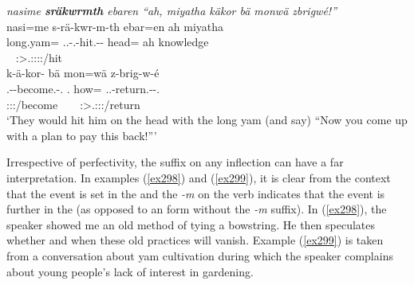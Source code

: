 \begin{exe}
	\ex \emph{nasime \textbf{sräkwrmth} ebaren ``ah, miyatha käkor bä monwä zbrigwé!''}\\
	\glll nasi=me s-rä-kwr-m-th ebar=en ah miyatha \\
	long.yam={\Ins} \Tsg.\Masc.\Bet-\Irr.\Ndu-hit.\Rs-\Dur-\Stnsg{} head={\Loc} ah knowledge\\
	~ {\footnotesize \Stpl:\Sbj>\Tsg.\Masc:\Obj:\Irr:\Pfv:\Bg/hit} ~ ~ ~\\
	\sn
	\glll k-ä-kor-\Zero{} bä mon=wä z-brig-w-é\\
	\M.\Bet-\Ndu-become.\Rs-\Ssg.{\Imp} \Second.{\Abs} how={\Emph} \Tsg.\F.\Bet-return.\Ext-\Ndu-\Ssg.\Imp\\
	{\footnotesize \Ssg:\Sbj:\Imp:\Pfv/become} ~ ~ {\footnotesize \Ssg:\Sbj>\Tsg.\F:\Obj:\Imp:\Ipfv/return}\\
	\trans `They would hit him on the head with the long yam (and say) ``Now you come up with a plan to pay this back!''' 
	\label{ex297}
\end{exe}

Irrespective of perfectivity, the  suffix on any  inflection can have a far  interpretation. In examples (\ref{ex298}) and (\ref{ex299}), it is clear from the context that the event is set in the  and the \emph{-m} on the verb indicates that the event is further in the  (as opposed to an  form without the \emph{-m} suffix). In (\ref{ex298}), the speaker showed me an old method of tying a bowstring. He then speculates whether and when these old practices will vanish. Example (\ref{ex299}) is taken from a conversation about yam cultivation during which the speaker complains about young people's lack of interest in gardening.

